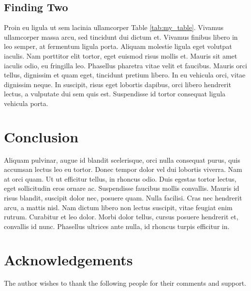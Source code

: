 \documentclass[11pt]{article}           %
\begin{document}
\begin{multicols}{2}
\subsection{Finding Two}

Proin eu ligula ut sem lacinia ullamcorper Table \ref{tab:my_table}. Vivamus ullamcorper massa arcu, sed tincidunt dui dictum et. Vivamus finibus libero in leo semper, at fermentum ligula porta. Aliquam molestie ligula eget volutpat iaculis. Nam porttitor elit tortor, eget euismod risus mollis et. Mauris sit amet iaculis odio, eu fringilla leo. Phasellus pharetra vitae velit et faucibus. Mauris orci tellus, dignissim et quam eget, tincidunt pretium libero. In eu vehicula orci, vitae dignissim neque. In suscipit, risus eget lobortis dapibus, orci libero hendrerit lectus, a vulputate dui sem quis est. Suspendisse id tortor consequat ligula vehicula porta.

\section{Conclusion}

Aliquam pulvinar, augue id blandit scelerisque, orci nulla consequat purus, quis accumsan lectus leo eu tortor. Donec tempor dolor vel dui lobortis viverra. Nam at orci quam. Ut ut efficitur tellus, in rhoncus odio. Duis egestas tortor lectus, eget sollicitudin eros ornare ac. Suspendisse faucibus mollis convallis. Mauris id risus blandit, suscipit dolor nec, posuere quam. Nulla facilisi. Cras nec hendrerit arcu, a mattis nisl. Nam dictum libero non lectus suscipit, vitae feugiat enim rutrum. Curabitur et leo dolor. Morbi dolor tellus, cursus posuere hendrerit et, convallis id nunc. Phasellus ultrices ante nulla, id rhoncus turpis efficitur in.

\section*{Acknowledgements}

The author wishes to thank the following people for their comments and support.


\setlength{\bibsep}{0.00cm plus 0.05cm} %



\end{multicols}
\end{document}
